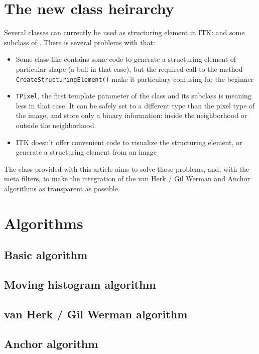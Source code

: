 \documentclass{InsightArticle}
\begin{document}
\section{The new class heirarchy}
Several classes can currently be used as structuring element in ITK: 
and some subclass of . There is several problems with that:
\begin{itemize}
  \item Some class like 
contains some code to generate a structuring element of particular shape
(a ball in that case), but the required call to the method \verb$CreateStructuringElement()$
make it particulary confusing for the beginner
  \item \verb$TPixel$, the first template parameter
of the  class and its subclass is meaning less in that case. It
can be safely set to a different type than the pixel type of the image, and store
only a binary information: inside the neighborhood or outside the neighborhood.
  \item ITK doesn't offer convenient code to visualize the structuring element,
or generate a structuring element from an image
\end{itemize}

The  class provided with this article aims to solve those
problems, and, with the meta filters, to make the integration of the van Herk
/ Gil Werman and Anchor algorithms as transparent as possible.

\section{Algorithms}

 \subsection{Basic algorithm}

 \subsection{Moving histogram algorithm}

 \subsection{van Herk / Gil Werman algorithm}

 \subsection{Anchor algorithm}
\end{document}
